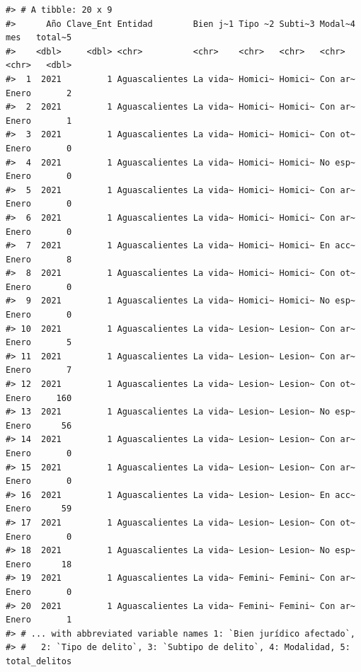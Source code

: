 \documentclass[
]{book}
\begin{document}
\begin{verbatim}
#> # A tibble: 20 x 9
#>      Año Clave_Ent Entidad        Bien j~1 Tipo ~2 Subti~3 Modal~4 mes   total~5
#>    <dbl>     <dbl> <chr>          <chr>    <chr>   <chr>   <chr>   <chr>   <dbl>
#>  1  2021         1 Aguascalientes La vida~ Homici~ Homici~ Con ar~ Enero       2
#>  2  2021         1 Aguascalientes La vida~ Homici~ Homici~ Con ar~ Enero       1
#>  3  2021         1 Aguascalientes La vida~ Homici~ Homici~ Con ot~ Enero       0
#>  4  2021         1 Aguascalientes La vida~ Homici~ Homici~ No esp~ Enero       0
#>  5  2021         1 Aguascalientes La vida~ Homici~ Homici~ Con ar~ Enero       0
#>  6  2021         1 Aguascalientes La vida~ Homici~ Homici~ Con ar~ Enero       0
#>  7  2021         1 Aguascalientes La vida~ Homici~ Homici~ En acc~ Enero       8
#>  8  2021         1 Aguascalientes La vida~ Homici~ Homici~ Con ot~ Enero       0
#>  9  2021         1 Aguascalientes La vida~ Homici~ Homici~ No esp~ Enero       0
#> 10  2021         1 Aguascalientes La vida~ Lesion~ Lesion~ Con ar~ Enero       5
#> 11  2021         1 Aguascalientes La vida~ Lesion~ Lesion~ Con ar~ Enero       7
#> 12  2021         1 Aguascalientes La vida~ Lesion~ Lesion~ Con ot~ Enero     160
#> 13  2021         1 Aguascalientes La vida~ Lesion~ Lesion~ No esp~ Enero      56
#> 14  2021         1 Aguascalientes La vida~ Lesion~ Lesion~ Con ar~ Enero       0
#> 15  2021         1 Aguascalientes La vida~ Lesion~ Lesion~ Con ar~ Enero       0
#> 16  2021         1 Aguascalientes La vida~ Lesion~ Lesion~ En acc~ Enero      59
#> 17  2021         1 Aguascalientes La vida~ Lesion~ Lesion~ Con ot~ Enero       0
#> 18  2021         1 Aguascalientes La vida~ Lesion~ Lesion~ No esp~ Enero      18
#> 19  2021         1 Aguascalientes La vida~ Femini~ Femini~ Con ar~ Enero       0
#> 20  2021         1 Aguascalientes La vida~ Femini~ Femini~ Con ar~ Enero       1
#> # ... with abbreviated variable names 1: `Bien jurídico afectado`,
#> #   2: `Tipo de delito`, 3: `Subtipo de delito`, 4: Modalidad, 5: total_delitos
\end{verbatim}
\end{document}
